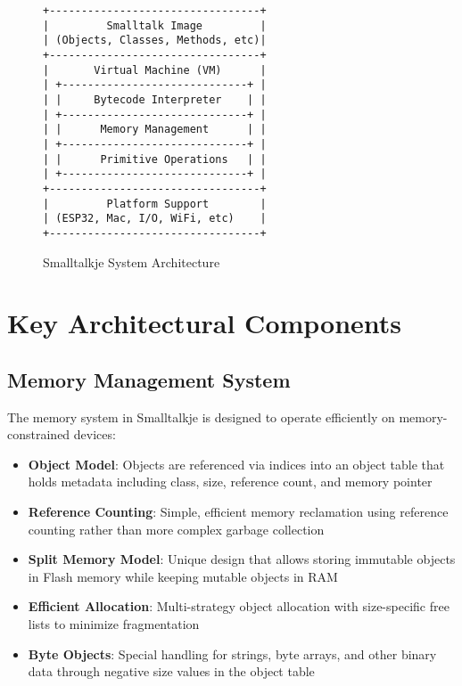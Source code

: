 \documentclass[12pt,a4paper]{report}
\begin{document}
\begin{figure}[h]
\centering
\begin{tcolorbox}[colback=white, colframe=black, width=\textwidth, arc=0mm, boxrule=1pt]
\begin{verbatim}
+---------------------------------+
|         Smalltalk Image         |
| (Objects, Classes, Methods, etc)|
+---------------------------------+
|       Virtual Machine (VM)      |
| +-----------------------------+ |
| |     Bytecode Interpreter    | |
| +-----------------------------+ |
| |      Memory Management      | |
| +-----------------------------+ |
| |      Primitive Operations   | |
| +-----------------------------+ |
+---------------------------------+
|         Platform Support        |
| (ESP32, Mac, I/O, WiFi, etc)    |
+---------------------------------+
\end{verbatim}
\end{tcolorbox}
\caption{Smalltalkje System Architecture}
\end{figure}

\section{Key Architectural Components}

\subsection{Memory Management System}
The memory system in Smalltalkje is designed to operate efficiently on memory-constrained devices:

\begin{itemize}
    \item \textbf{Object Model}: Objects are referenced via indices into an object table that holds metadata including class, size, reference count, and memory pointer
    \item \textbf{Reference Counting}: Simple, efficient memory reclamation using reference counting rather than more complex garbage collection
    \item \textbf{Split Memory Model}: Unique design that allows storing immutable objects in Flash memory while keeping mutable objects in RAM
    \item \textbf{Efficient Allocation}: Multi-strategy object allocation with size-specific free lists to minimize fragmentation
    \item \textbf{Byte Objects}: Special handling for strings, byte arrays, and other binary data through negative size values in the object table
\end{itemize}
\end{document}
